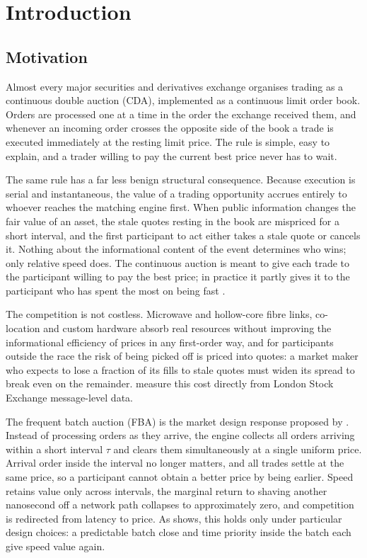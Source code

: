 \chapter{Introduction}
\label{ch:introduction}

\section{Motivation}
\label{sec:motivation}

Almost every major securities and derivatives exchange organises trading
as a continuous double auction (CDA), implemented as a continuous limit
order book. Orders are processed one at a time in the order the exchange
received them, and whenever an incoming order crosses the opposite side of
the book a trade is executed immediately at the resting limit price. The
rule is simple, easy to explain, and a trader willing to pay the current
best price never has to wait.

The same rule has a far less benign structural consequence. Because
execution is serial and instantaneous, the value of a trading opportunity
accrues entirely to whoever reaches the matching engine first. When public
information changes the fair value of an asset, the stale quotes resting
in the book are mispriced for a short interval, and the first participant
to act either takes a stale quote or cancels it. Nothing about the
informational content of the event determines who wins; only relative
speed does. The continuous auction is meant to give each trade to the
participant willing to pay the best price; in practice it partly gives it
to the participant who has spent the most on being fast
\citep{budish2015hft}.

The competition is not costless. Microwave and hollow-core fibre links,
co-location and custom hardware absorb real resources without improving
the informational efficiency of prices in any first-order way, and for
participants outside the race the risk of being picked off is priced into
quotes: a market maker who expects to lose a fraction of its fills to
stale quotes must widen its spread to break even on the remainder.
\citet{aquilina2022quantifying} measure this cost directly from London
Stock Exchange message-level data.

The frequent batch auction (FBA) is the market design response proposed by
\citet{budish2015hft}. Instead of processing orders as they arrive, the
engine collects all orders arriving within a short interval $\tau$ and
clears them simultaneously at a single uniform price. Arrival order inside
the interval no longer matters, and all trades settle at the same price, so
a participant cannot obtain a better price by being earlier. Speed retains
value only across intervals, the marginal return to shaving another
nanosecond off a network path collapses to approximately zero, and
competition is redirected from latency to price. As 
shows, this holds only under particular design choices: a predictable
batch close and time priority inside the batch each give speed value
again.

